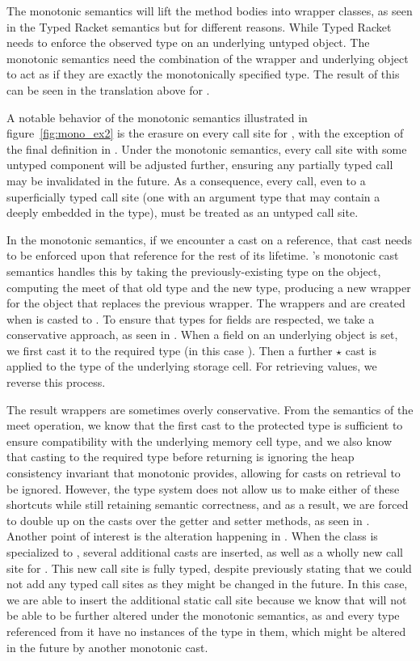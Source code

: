 \documentclass[a4paper,USenglish]{tex/lipics-v2016}
\begin{document}
The monotonic semantics will lift the method bodies into wrapper classes, as seen in
the Typed Racket semantics but for different reasons. While Typed Racket
needs to enforce the observed type on an underlying untyped object. The
monotonic semantics need the combination of the wrapper and underlying object 
to act as if they are exactly the monotonically specified type. 
The result of this can be seen in the translation above for \m.

A notable behavior of the monotonic semantics illustrated in
figure~\ref{fig:mono_ex2} is the erasure on every call site for \m, with the
exception of the final definition in .  Under the monotonic
semantics, every call site with some untyped component will be adjusted
further, ensuring any partially typed call may be invalidated in the future.
As a consequence, every call, even to a superficially typed call site (one
with an argument type that may contain a \any deeply embedded in the type),
must be treated as an untyped call site.

In the monotonic semantics, if we encounter a cast on a reference, that cast
needs to be enforced upon that reference for the rest of its
lifetime. \kafka's monotonic cast semantics handles this by taking the
previously-existing type on the object, computing the meet of that old type
and the new type, producing a new wrapper for the object that replaces the
previous wrapper. The wrappers  and  are created when \a is
casted to .  To ensure that types for fields are respected, we take a
conservative approach, as seen in . When a field on an underlying
object is set, we first cast it to the required type (in this case
). Then a further $\star$ cast is applied to the type of the
underlying storage cell. For retrieving values, we reverse this process.

The result wrappers are sometimes overly conservative. From the semantics of
the meet operation, we know that the first cast to the protected type is
sufficient to ensure compatibility with the underlying memory cell type, and
we also know that casting to the required type before returning is ignoring
the heap consistency invariant that monotonic provides, allowing for casts
on retrieval to be ignored. However, the \kafka type system does not allow
us to make either of these shortcuts while still retaining semantic
correctness, and as a result, we are forced to double up on the casts over
the getter and setter methods, as seen in .  Another point of
interest is the alteration happening in . When the class  is
specialized to , several additional casts are inserted, as well as a
wholly new call site for \m. This new call site is fully typed, despite
previously stating that we could not add any typed call sites as they might
be changed in the future.  In this case, we are able to insert the
additional static call site because we know that  will not be able to
be further altered under the monotonic semantics, as  and every type
referenced from it have no instances of the type \any in them, which might
be altered in the future by another monotonic cast.
\end{document}
